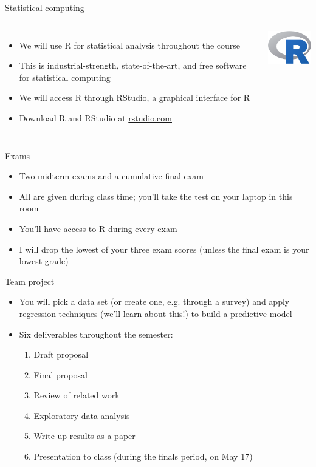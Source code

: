 \documentclass{beamer}\usepackage[]{graphicx}\usepackage[]{color}
\begin{document}
\begin{darkframes}
    \begin{frame}{Statistical computing}
      \begin{columns}[onlytextwidth]
          \begin{itemize}
            \item We will use \alert{R} for statistical analysis throughout the course
            \item This is industrial-strength, state-of-the-art, and free software for statistical computing
            \item We will access R through \alert{RStudio}, a graphical interface for R
            \item Download R and RStudio at \url{rstudio.com}
          \end{itemize}
          \includegraphics[width=1in]{R}
      \end{columns}
    \end{frame}

    \begin{frame}{Exams}
      \begin{itemize}
        \item Two midterm exams and a cumulative final exam
        \item All are given during class time; you'll take the test on your laptop in this room
        \item You'll have access to R during every exam
        \item I will drop the lowest of your three exam scores (unless the final exam is your lowest grade)
      \end{itemize}
    \end{frame}

    \begin{frame}{Team project}
      \begin{itemize}
        \item You will pick a data set (or create one, e.g. through a survey) and apply regression techniques (we'll learn about this!) to build a predictive model
        \item Six deliverables throughout the semester:
        \begin{enumerate}
        \item Draft proposal
        \item Final proposal
        \item Review of related work
        \item Exploratory data analysis
        \item Write up results as a paper
        \item Presentation to class (during the finals period, on May 17)
        \end{enumerate}
      \end{itemize}
    \end{frame}


\end{darkframes}
\end{document}
